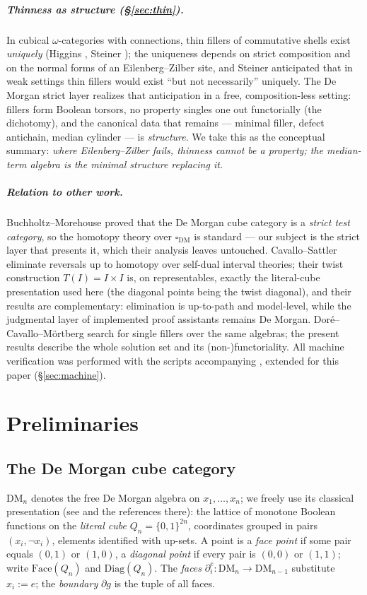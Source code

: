 \documentclass[11pt]{amsart}
\theoremstyle{definition}
\newcommand{\DM}{\mathrm{DM}}
\newcommand{\cube}{\square_{\mathrm{DM}}}
\newcommand{\lc}{Q}
\newcommand{\bnd}{\partial}
\newcommand{\Face}{\mathrm{Face}}
\newcommand{\Diag}{\mathrm{Diag}}
\begin{document}
\subparagraph*{Thinness as structure (\S\ref{sec:thin}).}  In
cubical $\omega$-categories with connections, thin fillers of
commutative shells exist \emph{uniquely} (Higgins \cite{Higgins},
Steiner \cite{Steiner}); the uniqueness depends on strict
composition and on the normal forms of an Eilenberg--Zilber
site, and Steiner anticipated that in weak settings thin fillers
would exist ``but not necessarily'' uniquely.  The De Morgan strict layer realizes that anticipation
in a free, composition-less setting: fillers form Boolean torsors,
no property singles one out functorially (the dichotomy), and the
canonical data that remains --- minimal filler, defect antichain,
median cylinder --- is \emph{structure}.  We take this as the
conceptual summary: \emph{where Eilenberg--Zilber fails, thinness
cannot be a property; the median-term algebra is the minimal
structure replacing it.}

\subparagraph*{Relation to other work.}  Buchholtz--Morehouse
\cite{BuchholtzMorehouse} proved that the De Morgan cube category is
a \emph{strict test category}, so the homotopy theory over $\cube$
is standard --- our subject is the strict layer that presents it,
which their analysis leaves untouched.  Cavallo--Sattler
\cite{CavalloSattler} eliminate reversals up to homotopy over
self-dual interval theories; their twist construction
$T(I) = I \times I$ is, on representables, exactly the literal-cube
presentation used here (the diagonal points being the twist
diagonal), and their results are complementary: elimination is
up-to-path and model-level, while the judgmental layer of
implemented proof assistants remains De Morgan.
Dor\'e--Cavallo--M\"ortberg \cite{DCM} search for single fillers
over the same algebras; the present results describe the whole
solution set and its (non-)functoriality.  All machine verification
was performed with the scripts accompanying \cite{DMFibers},
extended for this paper (\S\ref{sec:machine}).

\section{Preliminaries}
\label{sec:prelim}

\subsection{The De Morgan cube category}

$\DM_n$ denotes the free De Morgan algebra on $x_1, \dots, x_n$; we
freely use its classical presentation (see \cite{DMFibers} and the
references there): the lattice of monotone Boolean functions on the
\emph{literal cube} $\lc_n = \{0,1\}^{2n}$, coordinates grouped in
pairs $(x_i, \neg x_i)$, elements identified with up-sets.  A point
is a \emph{face point} if some pair equals $(0,1)$ or $(1,0)$, a
\emph{diagonal point} if every pair is $(0,0)$ or $(1,1)$; write
$\Face(\lc_n)$ and $\Diag(\lc_n)$.  The \emph{faces}
$\bnd_i^e : \DM_n \to \DM_{n-1}$ substitute $x_i := e$; the
\emph{boundary} $\bnd g$ is the tuple of all faces.
\end{document}

